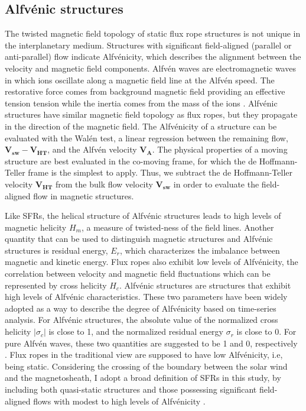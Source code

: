 \subsection{Alfv\'enic structures}
The twisted magnetic field topology of static flux rope structures is not unique in the interplanetary medium. Structures with significant field-aligned (parallel or anti-parallel) flow indicate Alfv\'enicity, which describes the alignment between the velocity and magnetic field components. Alfv\'en waves are electromagnetic waves in which ions oscillate along a magnetic field line at the Alfv\'en speed. The restorative force comes from background magnetic field providing an effective tension tension while the inertia comes from the mass of the ions \citep{Alfven:1942}. Alfv\'enic structures have similar magnetic field topology as flux ropes, but they propagate in the direction of the magnetic field. The Alfv\'enicity of a structure can be evaluated with the Wal\'en test, a linear regression between the remaining flow, $\mathbf{V_{sw}} - \mathbf{V_{HT}}$, and the Alfv\'en velocity $\mathbf{V_A}$. The physical properties of a moving structure are best evaluated in the co-moving frame, for which the de Hoffmann-Teller frame \citep{deHoffman-Teller:1950} is the simplest to apply. Thus, we subtract the de Hoffmann-Teller velocity $\mathbf{V_{HT}}$ from the bulk flow velocity $\mathbf{V_{sw}}$ in order to evaluate the field-aligned flow in magnetic structures.

Like SFRs, the helical structure of Alfv\'enic structures leads to high levels of magnetic helicity $H_m$\footnotemark{}, a measure of twisted-ness of the field lines. Another quantity that can be used to distinguish magnetic structures and Alfv\'enic structures is residual energy, $E_r$\footnotemark[\value{footnote}], which characterizes the imbalance between magnetic and kinetic energy. Flux ropes also exhibit low levels of Alfv\'enicity, the correlation between velocity and magnetic field fluctuations which can be represented by cross helicity $H_c$\footnotemark[\value{footnote}]. Alfv\'enic structures are structures that exhibit high levels of Alfv\'enic characteristics. These two parameters have been widely adopted as a way to describe the degree of Alfv\'enicity based on time-series analysis. For Alfv\'enic structures, the absolute value of the normalized cross helicity $|\sigma_c|$ is close to 1, and the normalized residual energy $\sigma_r$ is close to 0. For pure Alfv\'en waves, these two quantities are suggested to be 1 and 0, respectively \citep{Bruno:2013}. Flux ropes in the traditional view are supposed to have low Alfv\'enicity, i.e, being static. Considering the crossing of the boundary between the solar wind and the magnetosheath, I adopt a broad definition of SFRs in this study, by including both quasi-static structures and those possessing significant field-aligned flows with modest to high levels of Alfv\'enicity \citep{Chen:2022}.

